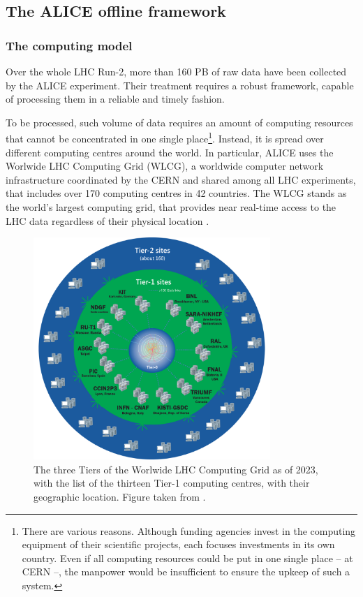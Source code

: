 \subsection{The ALICE offline framework}

\subsubsection{The computing model}
\label{subsubsec:computingmodel}

Over the whole LHC Run-2, more than 160 PB of raw data have been collected by the ALICE experiment. Their treatment requires a robust framework, capable of processing them in a reliable and timely fashion. 

To be processed, such volume of data requires an amount of computing resources that cannot be concentrated in one single place\footnote{There are various reasons. Although funding agencies invest in the computing equipment of their scientific projects, each focuses investments in its own country. Even if all computing resources could be put in one single place -- \eg at CERN --, the manpower would be insufficient to ensure the upkeep of such a system.}. Instead, it is spread over different computing centres around the world. In particular, ALICE uses the Worlwide LHC Computing Grid (WLCG), a worldwide computer network infrastructure coordinated by the CERN and shared among all LHC experiments, that includes over 170 computing centres in 42 countries. The WLCG stands as the world's largest computing grid, that provides near real-time access to the LHC data regardless of their physical location \cite{worldwidelhccomputinggridWorldwideLHCComputing2023}.

\begin{figure}[b]
	\centering
	\includegraphics[width=0.8\textwidth]{Figs/Chapter3/WLCG-Tiers-2021_v3_1.png}
	\caption{The three Tiers of the Worlwide LHC Computing Grid as of 2023, with the list of the thirteen Tier-1 computing centres, with their geographic location. Figure taken from \cite{worldwidelhccomputinggridWorldwideLHCComputing2023}.}
	\label{fig:WLCG}
\end{figure}

